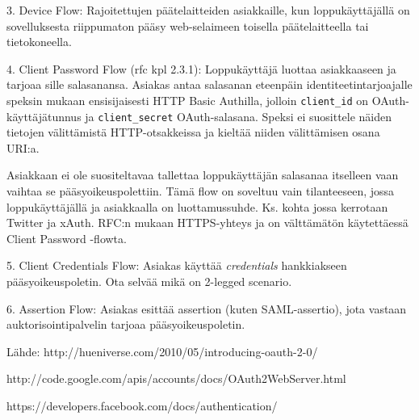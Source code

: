 \documentclass[finnish,gradu]{tktltiki}
\begin{document}
  3. Device Flow: Rajoitettujen päätelaitteiden asiakkaille, kun loppukäyttäjällä on sovelluksesta riippumaton pääsy web-selaimeen toisella päätelaitteella tai tietokoneella.

  4. Client Password Flow (rfc kpl 2.3.1): Loppukäyttäjä luottaa asiakkaaseen ja tarjoaa sille salasanansa. Asiakas antaa salasanan eteenpäin identiteetintarjoajalle speksin mukaan ensisijaisesti HTTP Basic Authilla, jolloin \verb!client_id! on OAuth-käyttäjätunnus ja \verb!client_secret! OAuth-salasana. Speksi ei suosittele näiden tietojen välittämistä HTTP-otsakkeissa ja kieltää niiden välittämisen osana URI:a.

  Asiakkaan ei ole suositeltavaa tallettaa loppukäyttäjän salasanaa itselleen vaan vaihtaa se pääsyoikeuspolettiin. Tämä flow on soveltuu vain tilanteeseen, jossa loppukäyttäjällä ja asiakkaalla on luottamussuhde. Ks. kohta jossa kerrotaan Twitter ja xAuth. RFC:n mukaan HTTPS-yhteys ja on välttämätön käytettäessä Client Password -flowta.

  5. Client Credentials Flow: Asiakas käyttää \emph{credentials} hankkiakseen pääsyoikeuspoletin. Ota selvää mikä on 2-legged scenario.

  6. Assertion Flow: Asiakas esittää assertion (kuten SAML-assertio), jota vastaan auktorisointipalvelin tarjoaa pääsyoikeuspoletin.

  Lähde: http://hueniverse.com/2010/05/introducing-oauth-2-0/



  http://code.google.com/apis/accounts/docs/OAuth2WebServer.html

  https://developers.facebook.com/docs/authentication/




\end{document}
